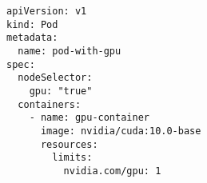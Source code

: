 \begin{verbatim}
apiVersion: v1
kind: Pod
metadata:
  name: pod-with-gpu
spec:
  nodeSelector:
    gpu: "true"
  containers:
    - name: gpu-container
      image: nvidia/cuda:10.0-base
      resources:
        limits:
          nvidia.com/gpu: 1
\end{verbatim}